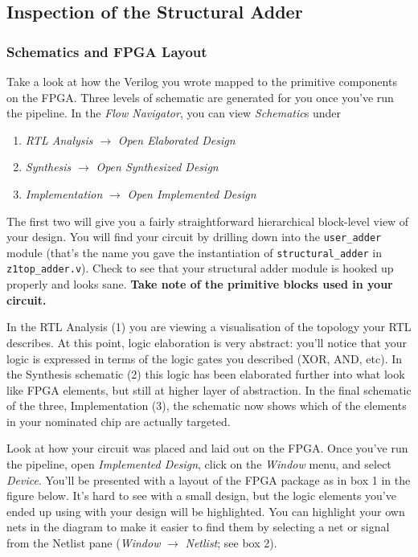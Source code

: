 \documentclass[11pt]{article}
\begin{document}
\subsection{Inspection of the Structural Adder}
\subsubsection{Schematics and FPGA Layout}
Take a look at how the Verilog you wrote mapped to the primitive components on the FPGA.
Three levels of schematic are generated for you once you've run the pipeline.
In the \emph{Flow Navigator}, you can view \emph{Schematic}s under

\begin{enumerate}
  \item \emph{RTL Analysis} $\rightarrow$ \emph{Open Elaborated Design}
  \item \emph{Synthesis} $\rightarrow$ \emph{Open Synthesized Design}
  \item \emph{Implementation} $\rightarrow$ \emph{Open Implemented Design}
\end{enumerate}

The first two will give you a fairly straightforward hierarchical block-level view of your design. You will find your circuit by drilling down into the \verb|user_adder| module (that's the name you gave the instantiation of \verb|structural_adder| in \verb|z1top_adder.v|). Check to see that your structural adder module is hooked up properly and looks sane. \textbf{Take note of the primitive blocks used in your circuit.}

In the RTL Analysis (1) you are viewing a visualisation of the topology your RTL describes. At this point, logic elaboration is very abstract: you'll notice that your logic is expressed in terms of the logic gates you described (XOR, AND, etc).
In the Synthesis schematic (2) this logic has been elaborated further into what look like FPGA elements, but still at higher layer of abstraction.
In the final schematic of the three, Implementation (3), the schematic now shows which of the elements in your nominated chip are actually targeted.

Look at how your circuit was placed and laid out on the FPGA.
Once you've run the pipeline, open \emph{Implemented Design}, click on the \emph{Window} menu, and select \emph{Device}.
You'll be presented with a layout of the FPGA package as in box 1 in the figure below.
It's hard to see with a small design, but the logic elements you've ended up using with your design will be highlighted.
You can highlight your own nets in the diagram to make it easier to find them by selecting a net or signal from the Netlist pane (\emph{Window} $\rightarrow$ \emph{Netlist}; see box 2).
\end{document}
